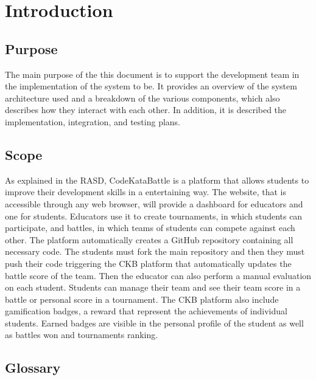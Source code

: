 \chapter{Introduction}
\section{Purpose}
The main purpose of the this document is to support the development team in the implementation of the system to be. \newline
It provides an overview of the system architecture used and a breakdown of the various 
components, which also describes how they interact with each other. \newline
In addition, it is described the implementation, integration, and testing plans.

\section{Scope}
As explained in the RASD, CodeKataBattle is a platform that allows students to improve their development skills in a entertaining way. \newline
The website, that is accessible through any web browser, will provide a dashboard for educators and one for students. \newline
Educators use it to create tournaments, in which students can participate, and battles, in which teams of students can compete against each other. \newline
The platform automatically creates a GitHub repository containing all necessary code. The students must fork the main repository and then they must push their code triggering the CKB platform that automatically updates the battle score of the team. Then the educator can also perform a manual evaluation on each student. \newline
Students can manage their team and see their team score in a battle or personal score in a tournament. \newline
The CKB platform also include gamification badges, a reward that represent the achievements of individual students. Earned badges are visible in the personal profile of the student as well as battles won and tournaments ranking. 

\section{Glossary}
